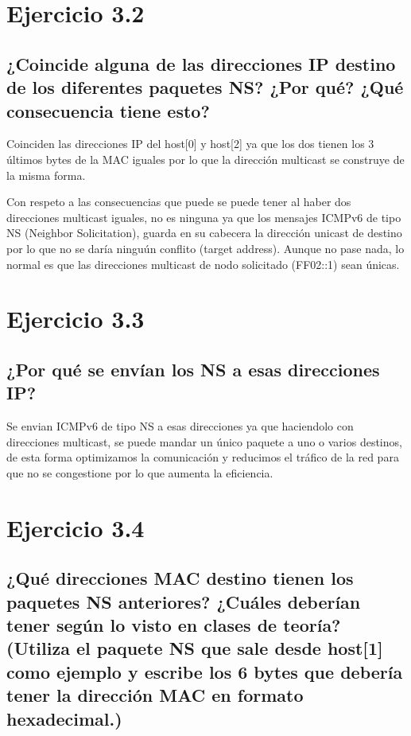 \section{Ejercicio 3.2}
\subsection{¿Coincide alguna de las direcciones IP destino de los diferentes paquetes NS? ¿Por qué? ¿Qué consecuencia
tiene esto?}

Coinciden las direcciones IP del host[0] y host[2] ya que los dos tienen los 3 últimos bytes de la MAC iguales por lo que la dirección multicast se construye de la misma forma.

Con respeto a las consecuencias que puede se puede tener al haber dos direcciones multicast iguales, no es ninguna ya que los mensajes ICMPv6 de tipo NS (Neighbor Solicitation), guarda en su cabecera la dirección unicast de destino por lo que no se daría ninguún conflito (target address). Aunque no pase nada, lo normal es que las direcciones multicast de nodo solicitado (FF02::1) sean únicas.


\section{Ejercicio 3.3}
\subsection{¿Por qué se envían los NS a esas direcciones IP?}

Se envian ICMPv6 de tipo NS a esas direcciones ya que haciendolo con direcciones multicast, se puede mandar un único paquete a uno o varios destinos, de esta forma optimizamos la comunicación y reducimos el tráfico de la red para que no se congestione por lo que aumenta la eficiencia. 


\section{Ejercicio 3.4}
\subsection{¿Qué direcciones MAC destino tienen los paquetes NS anteriores? ¿Cuáles deberían tener según lo visto en
clases de teoría? (Utiliza el paquete NS que sale desde host[1] como ejemplo y escribe los 6 bytes que debería
tener la dirección MAC en formato hexadecimal.)}

